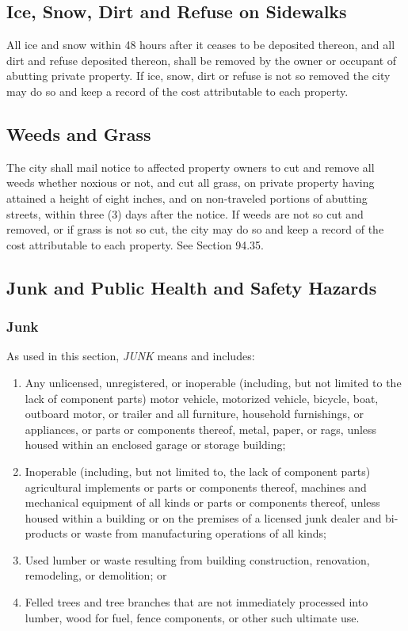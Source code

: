\subsection{Ice, Snow, Dirt and Refuse on Sidewalks}
All ice and snow within 48 hours after it ceases to be deposited thereon, and all dirt and refuse deposited thereon, shall be removed by the owner or occupant of abutting private property.  If ice, snow, dirt or refuse is not so removed the city may do so and keep a record of the cost attributable to each property.
\subsection{Weeds and Grass}
The city shall mail notice to affected property owners to cut and remove all weeds whether noxious or not, and cut all grass, on private property having attained a height of eight inches, and on non-traveled portions of abutting streets, within three (3) days after the notice.  If weeds are not so cut and removed, or if grass is not so cut, the city may do so and keep a record of the cost attributable to each property. See Section 94.35.
\subsection{Junk and Public Health and Safety Hazards}
\subsubsection{Junk}  As used in this section, \emph{JUNK} means and includes:
\begin{enumerate}[{\indent}a)]
    \item Any unlicensed, unregistered, or inoperable (including, but not limited to the lack of component parts) motor vehicle, motorized vehicle, bicycle, boat, outboard motor, or trailer and all furniture, household furnishings, or appliances, or parts or components thereof, metal, paper, or rags, unless housed within an enclosed garage or storage building; 
    \item Inoperable (including, but not limited to, the lack of component parts) agricultural implements or parts or components thereof, machines and mechanical equipment of all kinds or parts or components thereof, unless housed within a building or on the premises of a licensed junk dealer and bi-products or waste from manufacturing operations of all kinds; 
    \item Used lumber or waste resulting from building construction, renovation, remodeling, or demolition; or 
    \item Felled trees and tree branches that are not immediately processed into lumber, wood for fuel, fence components, or other such ultimate use.
\end{enumerate}
